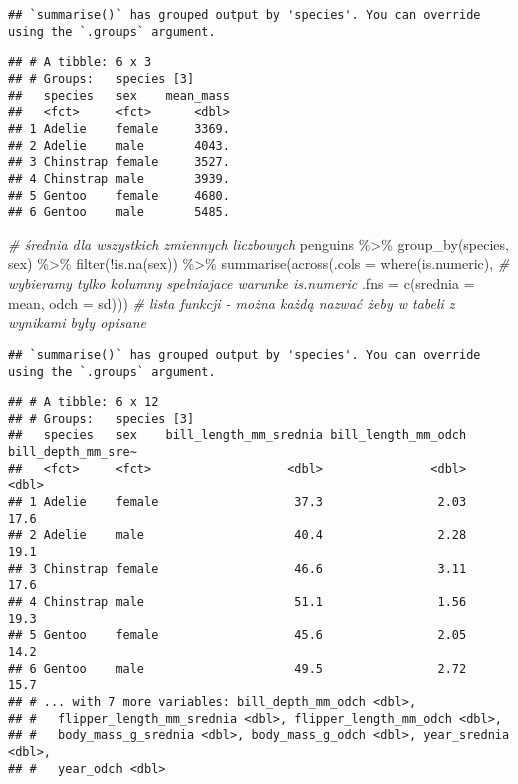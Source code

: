 \documentclass[
]{book}
\newenvironment{Shaded}{\begin{snugshade}}{\end{snugshade}}
\newcommand{\AttributeTok}[1]{\textcolor[rgb]{0.77,0.63,0.00}{#1}}
\newcommand{\CommentTok}[1]{\textcolor[rgb]{0.56,0.35,0.01}{\textit{#1}}}
\newcommand{\FunctionTok}[1]{\textcolor[rgb]{0.00,0.00,0.00}{#1}}
\newcommand{\NormalTok}[1]{#1}
\newcommand{\SpecialCharTok}[1]{\textcolor[rgb]{0.00,0.00,0.00}{#1}}
\begin{document}
\begin{verbatim}
## `summarise()` has grouped output by 'species'. You can override using the `.groups` argument.
\end{verbatim}

\begin{verbatim}
## # A tibble: 6 x 3
## # Groups:   species [3]
##   species   sex    mean_mass
##   <fct>     <fct>      <dbl>
## 1 Adelie    female     3369.
## 2 Adelie    male       4043.
## 3 Chinstrap female     3527.
## 4 Chinstrap male       3939.
## 5 Gentoo    female     4680.
## 6 Gentoo    male       5485.
\end{verbatim}

\begin{Shaded}
\begin{Highlighting}[]
\CommentTok{\# średnia dla wszystkich zmiennych liczbowych}
\NormalTok{penguins }\SpecialCharTok{\%\textgreater{}\%} \FunctionTok{group\_by}\NormalTok{(species, sex) }\SpecialCharTok{\%\textgreater{}\%} \FunctionTok{filter}\NormalTok{(}\SpecialCharTok{!}\FunctionTok{is.na}\NormalTok{(sex)) }\SpecialCharTok{\%\textgreater{}\%}
  \FunctionTok{summarise}\NormalTok{(}\FunctionTok{across}\NormalTok{(}\AttributeTok{.cols =} \FunctionTok{where}\NormalTok{(is.numeric), }\CommentTok{\# wybieramy tylko kolumny spełniajace warunke is.numeric}
                   \AttributeTok{.fns =} \FunctionTok{c}\NormalTok{(}\AttributeTok{srednia =}\NormalTok{ mean, }\AttributeTok{odch =}\NormalTok{ sd))) }\CommentTok{\# lista funkcji {-} można każdą nazwać żeby w tabeli z wynikami były opisane}
\end{Highlighting}
\end{Shaded}

\begin{verbatim}
## `summarise()` has grouped output by 'species'. You can override using the `.groups` argument.
\end{verbatim}

\begin{verbatim}
## # A tibble: 6 x 12
## # Groups:   species [3]
##   species   sex    bill_length_mm_srednia bill_length_mm_odch bill_depth_mm_sre~
##   <fct>     <fct>                   <dbl>               <dbl>              <dbl>
## 1 Adelie    female                   37.3                2.03               17.6
## 2 Adelie    male                     40.4                2.28               19.1
## 3 Chinstrap female                   46.6                3.11               17.6
## 4 Chinstrap male                     51.1                1.56               19.3
## 5 Gentoo    female                   45.6                2.05               14.2
## 6 Gentoo    male                     49.5                2.72               15.7
## # ... with 7 more variables: bill_depth_mm_odch <dbl>,
## #   flipper_length_mm_srednia <dbl>, flipper_length_mm_odch <dbl>,
## #   body_mass_g_srednia <dbl>, body_mass_g_odch <dbl>, year_srednia <dbl>,
## #   year_odch <dbl>
\end{verbatim}
\end{document}
